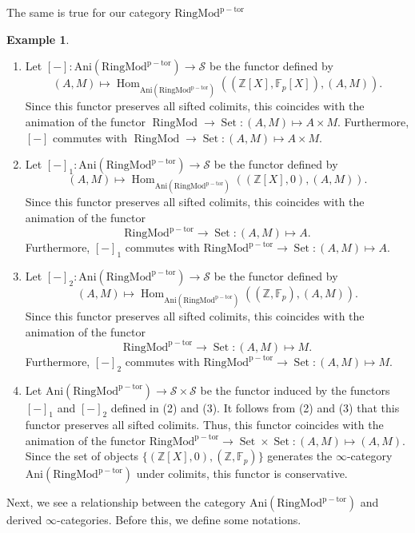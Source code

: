 \documentclass[11pt, a4paper]{amsart}
\theoremstyle{plain}
\theoremstyle{definition}
\newtheorem{example}[theorem]{Example}
\begin{document}
The same is true for our category $\operatorname{RingMod^{p-tor}}$
\begin{example}\label{exa3.15}
    \begin{enumerate}
        \item Let $[-]:\operatorname{Ani(RingMod^{p-tor})}\to \mathcal S$ be the functor defined by \[(A,M)\mapsto \operatorname{Hom}_{\operatorname{Ani(RingMod^{p-tor})}}((\mathbb Z[X],\mathbb F_p[X]),(A,M)).\] Since this functor preserves all sifted colimits, this coincides with the animation of the functor $\operatorname{RingMod}\to \operatorname{Set}:(A,M)\mapsto A\times M$. Furthermore, $[-]$ commutes with $\operatorname{RingMod}\to \operatorname{Set}:(A,M)\mapsto A\times M$.
        \item Let $[-]_1:\operatorname{Ani(RingMod^{p-tor})}\to \mathcal S$ be the functor defined by \[(A,M)\mapsto \operatorname{Hom}_{\operatorname{Ani(RingMod^{p-tor})}}((\mathbb Z[X],0),(A,M)).\] Since this functor preserves all sifted colimits, this coincides with the animation of the functor \[\operatorname{RingMod^{p-tor}}\to \operatorname{Set}:(A,M)\mapsto A.\] Furthermore, $[-]_1$ commutes with $\operatorname{RingMod^{p-tor}}\to \operatorname{Set}:(A,M)\mapsto A$.
        \item Let $[-]_2:\operatorname{Ani(RingMod^{p-tor})}\to \mathcal S$ be the functor defined by \[(A,M)\mapsto \operatorname{Hom}_{\operatorname{Ani(RingMod^{p-tor})}}((\mathbb Z,\mathbb F_p),(A,M)).\] Since this functor preserves all sifted colimits, this coincides with the animation of the functor \[\operatorname{RingMod^{p-tor}}\to \operatorname{Set}:(A,M)\mapsto M.\] Furthermore, $[-]_2$ commutes with $\operatorname{RingMod^{p-tor}}\to \operatorname{Set}:(A,M)\mapsto M$.
        \item Let $\operatorname{Ani(RingMod^{p-tor})}\to \mathcal S\times \mathcal S$ be the functor induced by the functors $[-]_1$ and $[-]_2$ defined in (2) and (3). It follows from (2) and (3) that this functor preserves all sifted colimits. Thus, this functor coincides with the animation of the functor $\operatorname{RingMod^{p-tor}}\to \operatorname{Set}\times\operatorname{Set}:(A,M)\mapsto (A,M)$. Since the set of objects $\{(\mathbb Z[X],0),(\mathbb Z,\mathbb F_p)\}$ generates the $\infty$-category $\operatorname{Ani(RingMod^{p-tor})}$ under colimits, this functor is conservative.
    \end{enumerate}
\end{example}

Next, we see a relationship between the category $\operatorname{Ani(RingMod^{p-tor})}$ and derived $\infty$-categories. Before this, we define some notations.
\end{document}
